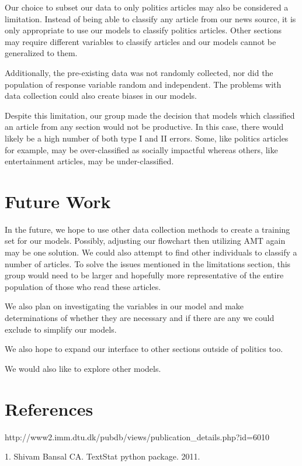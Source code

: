 \documentclass[10pt,letterpaper]{article}
\begin{document}
Our choice to subset our data to only politics articles may also be
considered a limitation. Instead of being able to classify any article
from our news source, it is only appropriate to use our models to
classify politics articles. Other sections may require different
variables to classify articles and our models cannot be generalized to
them.

Additionally, the pre-existing data was not randomly collected, nor did
the population of response variable random and independent. The problems
with data collection could also create biases in our models.

Despite this limitation, our group made the decision that models which
classified an article from any section would not be productive. In this
case, there would likely be a high number of both type I and II errors.
Some, like politics articles for example, may be over-classified as
socially impactful whereas others, like entertainment articles, may be
under-classified.

\section{Future Work}\label{future-work}

In the future, we hope to use other data collection methods to create a
training set for our models. Possibly, adjusting our flowchart then
utilizing AMT again may be one solution. We could also attempt to find
other individuals to classify a number of articles. To solve the issues
mentioned in the limitations section, this group would need to be larger
and hopefully more representative of the entire population of those who
read these articles.

We also plan on investigating the variables in our model and make
determinations of whether they are necessary and if there are any we
could exclude to simplify our models.

We also hope to expand our interface to other sections outside of
politics too.

We would also like to explore other models.

\section*{References}\label{references}

http://www2.imm.dtu.dk/pubdb/views/publication\_details.php?id=6010

\hypertarget{refs}{}
\hypertarget{ref-textstat}{}
1. Shivam Bansal CA. TextStat python package. 2011.
\end{document}
